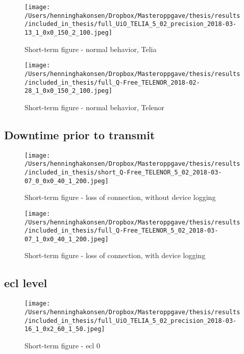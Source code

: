 \documentclass[USenglish]{ifimaster}  %
\begin{document}
\begin{figure}[H]
  \centering
  \texttt{[image: /Users/henninghakonsen/Dropbox/Masteroppgave/thesis/results/included\_in\_thesis/full\_UiO\_TELIA\_5\_02\_precision\_2018-03-13\_1\_0x0\_150\_2\_100.jpeg]}
  \caption{Short-term figure - normal behavior, Telia}
  \label{figure:2x150_UIO_TELIA}
\end{figure}

\begin{figure}[H]
  \centering
  \texttt{[image: /Users/henninghakonsen/Dropbox/Masteroppgave/thesis/results/included\_in\_thesis/full\_Q-Free\_TELENOR\_2018-02-28\_1\_0x0\_150\_2\_100.jpeg]}
  \caption{Short-term figure - normal behavior, Telenor}
  \label{figure:2x150_QFREE_TELENOR}
\end{figure}

\subsection{Downtime prior to transmit} \label{ssection:downtimeprior}
\begin{figure}[H]
  \centering
  \texttt{[image: /Users/henninghakonsen/Dropbox/Masteroppgave/thesis/results/included\_in\_thesis/short\_Q-Free\_TELENOR\_5\_02\_2018-03-07\_0\_0x0\_40\_1\_200.jpeg]}
  \caption{Short-term figure - loss of connection, without device logging}
  \label{figure:1x40_QFREE_TELENOR_0LOG}
\end{figure}

\begin{figure}[H]
  \centering
  \texttt{[image: /Users/henninghakonsen/Dropbox/Masteroppgave/thesis/results/included\_in\_thesis/full\_Q-Free\_TELENOR\_5\_02\_2018-03-07\_1\_0x0\_40\_1\_200.jpeg]}
  \caption{Short-term figure - loss of connection, with device logging}
  \label{figure:1x40_QFREE_TELENOR_1LOG}
\end{figure}

\subsection{\acrshort{ecl} level} \label{ssection:ecllevel}
\begin{figure}[H]
  \centering
  \texttt{[image: /Users/henninghakonsen/Dropbox/Masteroppgave/thesis/results/included\_in\_thesis/full\_UiO\_TELIA\_5\_02\_precision\_2018-03-16\_1\_0x2\_60\_1\_50.jpeg]}
  \caption{Short-term figure - \acrshort{ecl} 0}
  \label{figure:1x60_UIO_TELIA_ECL_0}
\end{figure}
\end{document}
